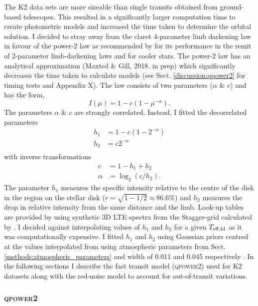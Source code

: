  The K2 data sets are more sizeable than single transits obtained from ground-based telescopes. This resulted in a significantly larger computation time to create photometric models and increased the time taken to determine the orbital solution. I decided to stray away from the claret 4-parameter limb darkening law in favour of the power-2 law \citep{1997A&A...327..199H} as recommended by \citet{2017AJ....154..111M} for its performance in the remit of 2-parameter limb-darkening laws and for cooler stars. The power-2 law has an analytical approximation (Maxted \& Gill, 2018. in prep) which significantly decreases the time taken to calculate models (see Sect. \ref{discussion:qpower2} for timing tests and Appendix X). The law consists of two parameters ($\alpha$ \& $c$) and has the form,
%
\begin{equation}
I(\mu) = 1 - c(1 - \mu^{-\alpha}). 
\end{equation}
%
The parameters $\alpha$ \& $c$ are strongly correlated. Instead, I fitted the decorrelated parameters
%
\begin{eqnarray}
h_1 &= 1 - c(1 - 2^{-\alpha}) \\
h_2 &= c2^{-\alpha} \\
\end{eqnarray}
%
with inverse transformations
%
\begin{eqnarray}
c &= 1 - h_1 + h_2 \\
\alpha &= \log_2(c/h_2).
\end{eqnarray}
%
The parameter $h_1$ measures the specific intensity relative to the centre of the disk in the region on the stellar disk ($r = \sqrt{1 − 1/2} \approx 86.6\%$) and $h_2$ measures the drop in relative intensity from the same distance and the limb. Look-up tables are provided by \citet{2018A&A...616A..39M} using synthetic 3D LTE spectra from the Stagger-grid calculated by \citet{2015A&A...573A..90M}. I decided against interpolating values of $h_1$ and $h_2$ for a given $T_{\rm eff,ld}$ as it was computationally expensive. I fitted $h_1$ and $h_2$ using Gaussian priors centred at the values interpolated from \citet{2018A&A...616A..39M} using atmospheric parameters from Sect. \ref{methods:atmospheric_parameters} and width of 0.011 and 0.045 respectively \citep{2018A&A...616A..39M}. In the following sections I describe the fast transit model (\textsc{qpower2}) used for K2 datasets along with the red-noise model to account for out-of-transit variations.

\subsubsection{\textsc{qpower2}}

